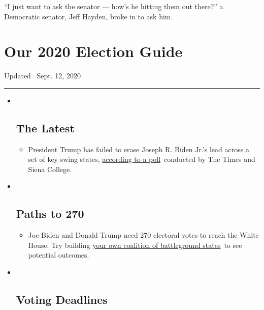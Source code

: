 ``I just want to ask the senator --- how's he hitting them out there?''
a Democratic senator, Jeff Hayden, broke in to ask him.

\hypertarget{our-2020-election-guide}{%
\section{Our 2020 Election Guide}\label{our-2020-election-guide}}

Updated ~Sept. 12, 2020

\begin{center}\rule{0.5\linewidth}{\linethickness}\end{center}

\begin{itemize}
\item ~
  \hypertarget{the-latest}{%
  \subsection{The Latest}\label{the-latest}}

  \begin{itemize}
  \item
    President Trump has failed to erase Joseph R. Biden Jr.'s lead
    across a set of key swing states,
    \href{https://www.nytimes3xbfgragh.onion/2020/09/12/us/politics/biden-trump-poll-wisconsin-minnesota.html?action=click\&pgtype=Article\&state=default\&region=BELOW_MAIN_CONTENT\&context=storylines_guide}{according
    to a poll}~conducted by The Times and Siena College.
  \end{itemize}
\item ~
  \hypertarget{paths-to-270}{%
  \subsection{Paths to 270}\label{paths-to-270}}

  \begin{itemize}
  \item
    Joe Biden and Donald Trump need 270 electoral votes to reach the
    White House. Try building
    \href{https://www.nytimes3xbfgragh.onion/interactive/2020/us/elections/election-states-biden-trump.html?action=click\&pgtype=Article\&state=default\&region=BELOW_MAIN_CONTENT\&context=storylines_guide}{your
    own coalition of battleground states}~to see potential outcomes.
  \end{itemize}
\item ~
  \hypertarget{voting-deadlines}{%
  \subsection{Voting Deadlines}\label{voting-deadlines}}


\end{itemize}
